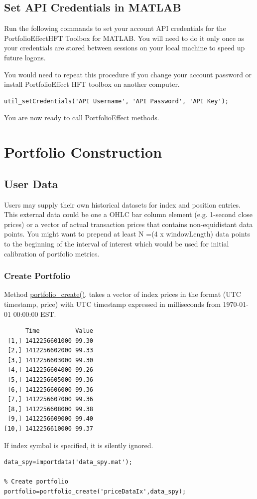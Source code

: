 \documentclass[letterpaper]{report}
\newcounter{N}
\begin{document}
\section{Set API Credentials in MATLAB} 
Run the following commands to set your account API credentials for the
PortfolioEffectHFT Toolbox for MATLAB.
You will need to do it only once as your credentials are stored between sessions
on your local machine to speed up future logons. \par You would need to repeat
this procedure if you change your account password or install PortfolioEffect
HFT toolbox on another computer.
\begin{lstlisting}
util_setCredentials('API Username', 'API Password', 'API Key');
\end{lstlisting}
You are now ready to call PortfolioEffect methods.


\chapter{Portfolio Construction}
\section{User Data}
Users may supply their own historical datasets for index and position entries. 
This external data could be one a OHLC bar column element (e.g. 1-second close prices) or a vector of actual transaction prices that contains non-equidistant data points. 
You might want to prepend at least N =(4 x windowLength) data points to the
beginning of the interval of interest which would be used for initial calibration of portfolio metrics.
\subsection{Create Portfolio} 
Method
\href{https://www.portfolioeffect.com/docs/platform/quant/functions/general-functions/portfolio-create}{portfolio\_create()}.
takes a vector of index prices in the format (UTC timestamp, price) with UTC
timestamp expressed in milliseconds from 1970-01-01 00:00:00 EST.
\begin{lstlisting}
      Time          Value
 [1,] 1412256601000 99.30
 [2,] 1412256602000 99.33
 [3,] 1412256603000 99.30
 [4,] 1412256604000 99.26
 [5,] 1412256605000 99.36
 [6,] 1412256606000 99.36
 [7,] 1412256607000 99.36
 [8,] 1412256608000 99.38
 [9,] 1412256609000 99.40
[10,] 1412256610000 99.37
\end{lstlisting}
If index symbol is specified, it is silently ignored.
\begin{lstlisting}
data_spy=importdata('data_spy.mat'); 

% Create portfolio
portfolio=portfolio_create('priceDataIx',data_spy);
\end{lstlisting}
\end{document}
